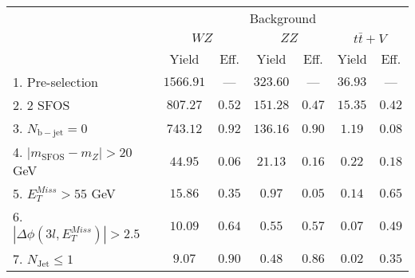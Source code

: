 \begin{tabular}{l||c|c||c|c||c|c}
\hline
 &       \multicolumn{6}{c}{Background} \\
 & \multicolumn{2}{c||}{$WZ$} & \multicolumn{2}{c||}{$ZZ$} & \multicolumn{2}{c}{$t\bar{t}+V$}  \\ 
 & Yield & Eff. & Yield & Eff. & Yield & Eff.  \\
\hline\hline
1. Pre-selection &  $1566.91$ & --- &  $323.60$ & --- &  $36.93$ & --- \\ 
\hline
2. 2 SFOS &  $807.27$ &  $0.52$ &  $151.28$ &  $0.47$ &  $15.35$ &  $0.42$  \\ 
\hline
3. $N_{\mathrm{b-jet}}=0$ &  $743.12$ &  $0.92$ &  $136.16$ &  $0.90$ &  $1.19$ &  $0.08$ \\ 
\hline
4. $| m_{\mathrm{SFOS}} - m_Z | >  20$ GeV &  $44.95$ &  $0.06$ &  $21.13$ &  $0.16$ &  $0.22$ &  $0.18$\\ 
\hline
5. $E_{T}^{Miss} > 55$ GeV &  $15.86$ &  $0.35$ &  $0.97$ &  $0.05$ &  $0.14$ &  $0.65$ \\ 
\hline
6. $|\Delta\phi(3l,E_{T}^{Miss})| > 2.5$ &  $10.09$ &  $0.64$ &  $0.55$ &  $0.57$ &  $0.07$ &  $0.49$ \\ 
\hline
7. $N_{\mathrm{Jet}} \leq 1$ &  $9.07$ &  $0.90$ &  $0.48$ &  $0.86$ &  $0.02$ &  $0.35$ \\ 
\hline
\end{tabular}

